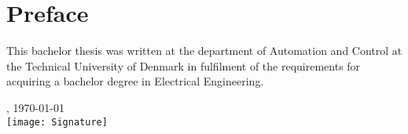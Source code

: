 \chapter{Preface}
This bachelor thesis was written at the department of Automation and Control at the Technical University of Denmark in fulfilment of the requirements for acquiring a bachelor degree in Electrical Engineering.

\vfill

{
\centering
    \thesislocation{}, \today\\[1cm]
    \hspace{3cm}\texttt{[image: Signature]}\\[1cm]
\begin{flushright}
    \thesisauthor{}
\end{flushright}
}
